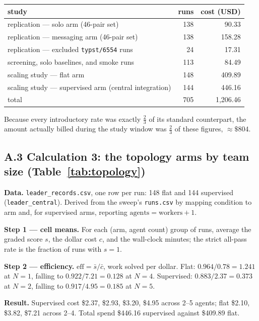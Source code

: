 \documentclass[11pt,a4paper]{article}
\begin{document}
\begin{center}
\begin{tabular}{lrr}
\hline
study & runs & cost (USD) \\
\hline
replication --- solo arm (46-pair set) & 138 & 90.33 \\
replication --- messaging arm (46-pair set) & 138 & 158.28 \\
replication --- excluded \texttt{typst/6554} runs & 24 & 17.31 \\
screening, solo baselines, and smoke runs & 113 & 84.49 \\
scaling study --- flat arm & 148 & 409.89 \\
scaling study --- supervised arm (central integration) & 144 & 446.16 \\
\hline
total & 705 & 1{,}206.46 \\
\hline
\end{tabular}
\end{center}

Because every introductory rate was exactly $\tfrac{2}{3}$ of its standard counterpart, the amount actually billed during the study window was $\tfrac{2}{3}$ of these figures, ${\approx}\$804$.

\subsection*{A.3 \quad Calculation 3: the topology arms by team size (Table~\ref{tab:topology})}

\textbf{Data.} \texttt{leader\_records.csv}, one row per run: 148 flat and 144 supervised (\texttt{leader\_central}). Derived from the sweep's \texttt{runs.csv} by mapping condition to arm and, for supervised arms, reporting $\text{agents} = \text{workers} + 1$.

\textbf{Step 1 --- cell means.} For each (arm, agent count) group of runs, average the graded score $s$, the dollar cost $c$, and the wall-clock minutes; the strict all-pass rate is the fraction of runs with $s = 1$.

\textbf{Step 2 --- efficiency.} $\text{eff} = \bar{s} / \bar{c}$, work solved per dollar. Flat: $0.964/0.78 = 1.241$ at $N=1$, falling to $0.922/7.21 = 0.128$ at $N=4$. Supervised: $0.883/2.37 = 0.373$ at $N=2$, falling to $0.917/4.95 = 0.185$ at $N=5$.

\textbf{Result.} Supervised cost \$2.37, \$2.93, \$3.20, \$4.95 across 2--5 agents; flat \$2.10, \$3.82, \$7.21 across 2--4. Total spend \$446.16 supervised against \$409.89 flat.
\end{document}
